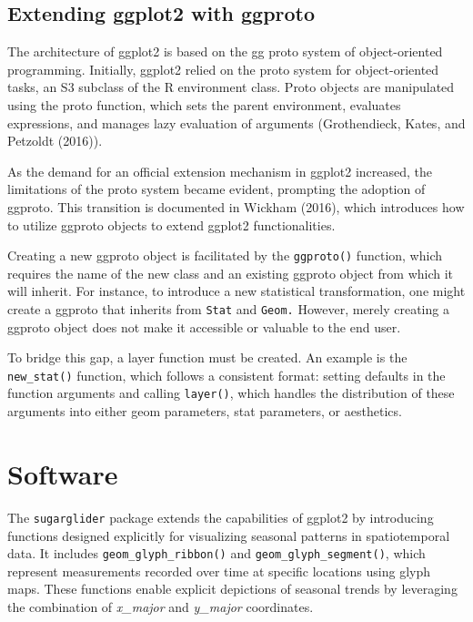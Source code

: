 \hypertarget{extending-ggplot2-with-ggproto}{%
\subsection{Extending ggplot2 with ggproto}\label{extending-ggplot2-with-ggproto}}

The architecture of ggplot2 is based on the gg proto system of object-oriented programming. Initially, ggplot2 relied on the proto system for object-oriented tasks, an S3 subclass of the R environment class. Proto objects are manipulated using the proto function, which sets the parent environment, evaluates expressions, and manages lazy evaluation of arguments (Grothendieck, Kates, and Petzoldt (2016)).

As the demand for an official extension mechanism in ggplot2 increased, the limitations of the proto system became evident, prompting the adoption of ggproto. This transition is documented in Wickham (2016), which introduces how to utilize ggproto objects to extend ggplot2 functionalities.

Creating a new ggproto object is facilitated by the \texttt{ggproto()} function, which requires the name of the new class and an existing ggproto object from which it will inherit. For instance, to introduce a new statistical transformation, one might create a ggproto that inherits from \texttt{Stat} and \texttt{Geom.} However, merely creating a ggproto object does not make it accessible or valuable to the end user.

To bridge this gap, a layer function must be created. An example is the \texttt{new\_stat()} function, which follows a consistent format: setting defaults in the function arguments and calling \texttt{layer()}, which handles the distribution of these arguments into either geom parameters, stat parameters, or aesthetics.

\hypertarget{software}{%
\section{Software}\label{software}}

The \texttt{sugarglider} package extends the capabilities of ggplot2 by introducing functions designed explicitly for visualizing seasonal patterns in spatiotemporal data. It includes \texttt{geom\_glyph\_ribbon()} and \texttt{geom\_glyph\_segment()}, which represent measurements recorded over time at specific locations using glyph maps. These functions enable explicit depictions of seasonal trends by leveraging the combination of \emph{x\_major} and \emph{y\_major} coordinates.

